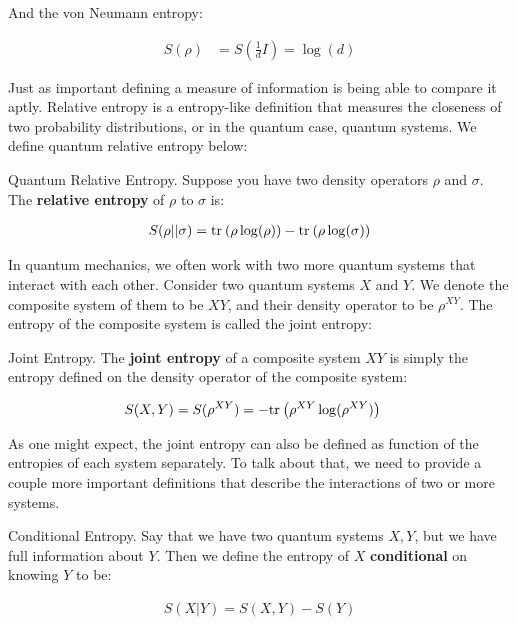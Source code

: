 And the von Neumann entropy:

\begin{align}
    S(\rho) &= S(\tfrac{1}{d}I) = \log(d)
\end{align}

Just as important defining a measure of information is being able to compare it aptly. Relative entropy is a entropy-like definition that measures the closeness of two probability distributions, or in the quantum case, quantum systems. We define quantum relative entropy below:

\begin{definition}{Quantum Relative Entropy.}
    Suppose you have two density operators $\rho$ and $\sigma$. The \textbf{relative entropy} of $\rho$ to $\sigma$ is:
    
    \begin{align}
        S(\rho||\sigma) = \text{tr}_{}\left( {\rho \log(\rho)} \right) - \text{tr}_{}\left( {\rho \log (\sigma)} \right)
    \end{align}
\end{definition}

In quantum mechanics, we often work with two more quantum systems that interact with each other. Consider two quantum systems $X$ and $Y$. We denote the composite system of them to be $XY$, and their density operator to be $\rho^{XY}$. The entropy of the composite system is called the joint entropy:

\begin{definition}{Joint Entropy.}
    The \textbf{joint entropy} of a composite system $XY$ is simply the entropy defined on the density operator of the composite system:
    
    \begin{align}
        S(X,Y) = S(\rho^{XY}) &= -\text{tr}_{}\left( {\rho^{XY} \log(\rho^{XY})} \right)
    \end{align}
\end{definition}

As one might expect, the joint entropy can also be defined as function of the entropies of each system separately. To talk about that, we need to provide a couple more important definitions that describe the interactions of two or more systems.

\begin{definition}{Conditional Entropy.}
    Say that we have two quantum systems $X,Y$, but we have full information about $Y$. Then we define the entropy of $X$ \textbf{conditional} on knowing $Y$ to be: 
    
    \begin{align}
        S(X|Y) = S(X,Y) - S(Y)
    \end{align}
\end{definition}

